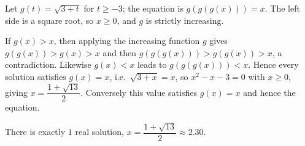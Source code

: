 Let $g(t)=\sqrt{3+t}$ for $t\ge-3$; the equation is $g(g(g(x)))=x$. The left side is a square root, so $x\ge0$, and $g$ is strictly increasing.

If $g(x)>x$, then applying the increasing function $g$ gives $g(g(x))>g(x)>x$ and then $g(g(g(x)))>g(g(x))>x$, a contradiction. Likewise $g(x)<x$ leads to $g(g(g(x)))<x$. Hence every solution satisfies $g(x)=x$, i.e.\ $\sqrt{3+x}=x$, so $x^2-x-3=0$ with $x\ge0$, giving $x=\dfrac{1+\sqrt{13}}{2}$. Conversely this value satisfies $g(x)=x$ and hence the equation.

There is exactly $\boxed{1}$ real solution, $x=\dfrac{1+\sqrt{13}}{2}\approx2.30$.
